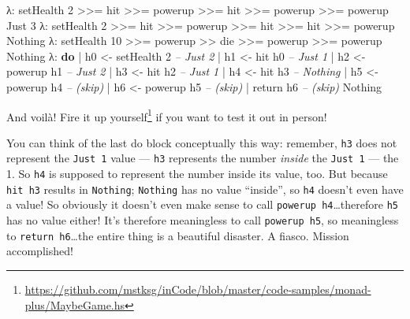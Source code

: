 \documentclass[]{article}
\newenvironment{Shaded}{}{}
\newcommand{\KeywordTok}[1]{\textcolor[rgb]{0.00,0.44,0.13}{\textbf{{#1}}}}
\newcommand{\DataTypeTok}[1]{\textcolor[rgb]{0.56,0.13,0.00}{{#1}}}
\newcommand{\DecValTok}[1]{\textcolor[rgb]{0.25,0.63,0.44}{{#1}}}
\newcommand{\CommentTok}[1]{\textcolor[rgb]{0.38,0.63,0.69}{\textit{{#1}}}}
\newcommand{\OtherTok}[1]{\textcolor[rgb]{0.00,0.44,0.13}{{#1}}}
\newcommand{\FunctionTok}[1]{\textcolor[rgb]{0.02,0.16,0.49}{{#1}}}
\newcommand{\NormalTok}[1]{{#1}}
\renewcommand{\href}[2]{#2\footnote{\url{#1}}}
\begin{document}
\begin{Shaded}
\begin{Highlighting}[]
\NormalTok{λ}\FunctionTok{:} \NormalTok{setHealth }\DecValTok{2} \FunctionTok{>>=} \NormalTok{hit }\FunctionTok{>>=} \NormalTok{powerup }\FunctionTok{>>=} \NormalTok{hit }\FunctionTok{>>=} \NormalTok{powerup }\FunctionTok{>>=} \NormalTok{powerup}
\DataTypeTok{Just} \DecValTok{3}
\NormalTok{λ}\FunctionTok{:} \NormalTok{setHealth }\DecValTok{2} \FunctionTok{>>=} \NormalTok{hit }\FunctionTok{>>=} \NormalTok{powerup }\FunctionTok{>>=} \NormalTok{hit }\FunctionTok{>>=} \NormalTok{hit }\FunctionTok{>>=} \NormalTok{powerup}
\DataTypeTok{Nothing}
\NormalTok{λ}\FunctionTok{:} \NormalTok{setHealth }\DecValTok{10} \FunctionTok{>>=} \NormalTok{powerup }\FunctionTok{>>} \NormalTok{die }\FunctionTok{>>=} \NormalTok{powerup }\FunctionTok{>>=} \NormalTok{powerup}
\DataTypeTok{Nothing}
\NormalTok{λ}\FunctionTok{:} \KeywordTok{do}
 \FunctionTok{|}     \NormalTok{h0 }\OtherTok{<-} \NormalTok{setHealth }\DecValTok{2}        \CommentTok{-- Just 2}
 \FunctionTok{|}     \NormalTok{h1 }\OtherTok{<-} \NormalTok{hit h0             }\CommentTok{-- Just 1}
 \FunctionTok{|}     \NormalTok{h2 }\OtherTok{<-} \NormalTok{powerup h1         }\CommentTok{-- Just 2}
 \FunctionTok{|}     \NormalTok{h3 }\OtherTok{<-} \NormalTok{hit h2             }\CommentTok{-- Just 1}
 \FunctionTok{|}     \NormalTok{h4 }\OtherTok{<-} \NormalTok{hit h3             }\CommentTok{-- Nothing}
 \FunctionTok{|}     \NormalTok{h5 }\OtherTok{<-} \NormalTok{powerup h4         }\CommentTok{-- (skip)}
 \FunctionTok{|}     \NormalTok{h6 }\OtherTok{<-} \NormalTok{powerup h5         }\CommentTok{-- (skip)}
 \FunctionTok{|}     \NormalTok{return h6                }\CommentTok{-- (skip)}
\DataTypeTok{Nothing}
\end{Highlighting}
\end{Shaded}

And voilà!
\href{https://github.com/mstksg/inCode/blob/master/code-samples/monad-plus/MaybeGame.hs}{Fire
it up yourself} if you want to test it out in person!

You can think of the last do block conceptually this way: remember,
\texttt{h3} does not represent the \texttt{Just\ 1} value ---
\texttt{h3} represents the number \emph{inside} the \texttt{Just\ 1} ---
the 1. So \texttt{h4} is supposed to represent the number inside its
value, too. But because \texttt{hit\ h3} results in \texttt{Nothing};
\texttt{Nothing} has no value ``inside'', so \texttt{h4} doesn't even
have a value! So obviously it doesn't even make sense to call
\texttt{powerup\ h4}\ldots{}therefore \texttt{h5} has no value either!
It's therefore meaningless to call \texttt{powerup\ h5}, so meaningless
to \texttt{return\ h6}\ldots{}the entire thing is a beautiful disaster.
A fiasco. Mission accomplished!
\end{document}
